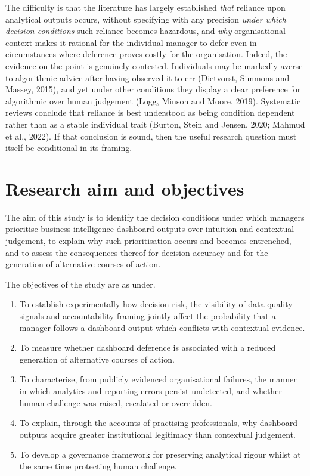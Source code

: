 \documentclass[12pt,a4paper]{article}
\begin{document}
The difficulty is that the literature has largely established \emph{that} reliance upon analytical outputs
occurs, without specifying with any precision \emph{under which decision conditions} such reliance becomes
hazardous, and \emph{why} organisational context makes it rational for the individual manager to defer even
in circumstances where deference proves costly for the organisation. Indeed, the evidence on the point is
genuinely contested. Individuals may be markedly averse to algorithmic advice after having observed it to
err (Dietvorst, Simmons and Massey, 2015), and yet under other conditions they display a clear preference
for algorithmic over human judgement (Logg, Minson and Moore, 2019). Systematic reviews conclude that
reliance is best understood as being condition dependent rather than as a stable individual trait (Burton,
Stein and Jensen, 2020; Mahmud et al., 2022). If that conclusion is sound, then the useful research
question must itself be conditional in its framing.

\section{Research aim and objectives}

The aim of this study is to identify the decision conditions under which managers prioritise business
intelligence dashboard outputs over intuition and contextual judgement, to explain why such prioritisation
occurs and becomes entrenched, and to assess the consequences thereof for decision accuracy and for the
generation of alternative courses of action.

The objectives of the study are as under.

\begin{enumerate}[leftmargin=*,itemsep=2pt,topsep=4pt]
\item To establish experimentally how decision risk, the visibility of data quality signals and
accountability framing jointly affect the probability that a manager follows a dashboard output which
conflicts with contextual evidence.
\item To measure whether dashboard deference is associated with a reduced generation of alternative courses
of action.
\item To characterise, from publicly evidenced organisational failures, the manner in which analytics and
reporting errors persist undetected, and whether human challenge was raised, escalated or overridden.
\item To explain, through the accounts of practising professionals, why dashboard outputs acquire greater
institutional legitimacy than contextual judgement.
\item To develop a governance framework for preserving analytical rigour whilst at the same time protecting
human challenge.
\end{enumerate}
\end{document}
